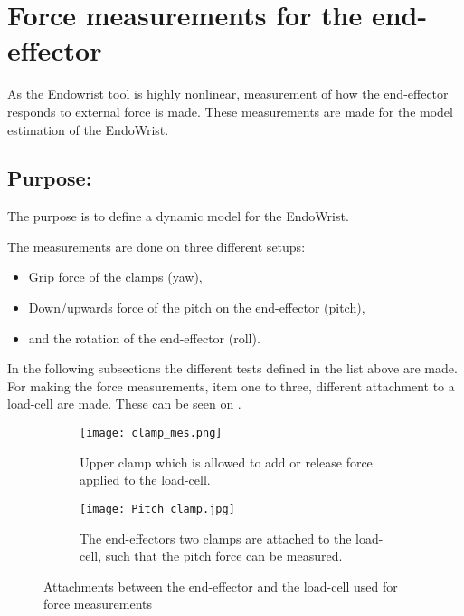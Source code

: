 \section{Force measurements for the end-effector} %

As the Endowrist tool is highly nonlinear, measurement of how the end-effector responds to external force is made. These measurements are made for the model estimation of the EndoWrist.  

\subsection*{Purpose:}
The purpose is to define a dynamic model for the EndoWrist.

The measurements are done on three different setups:
\begin{itemize}
\item Grip force of the clamps (yaw),
\item Down/upwards force of the pitch on the end-effector (pitch),
\item and the rotation of the end-effector (roll).
\end{itemize}

In the following subsections the different tests defined in the list above are made. For making the force measurements, item one to three, different attachment to a load-cell are made. These can be seen on .
\begin{figure}[H]
	\centering
	\begin{subfigure}{.48\textwidth}
		\centering
		\vspace{-12pt}
		\texttt{[image: clamp\_mes.png]}
		\caption{Upper clamp which is allowed to add or release force applied to the load-cell.}
		\label{fig:one_clamp}
	\end{subfigure}
	\begin{subfigure}{.48\textwidth}
		\centering
		\texttt{[image: Pitch\_clamp.jpg]}
		\caption{The end-effectors two clamps are attached to the load-cell, such that the pitch force can be measured.}
		\label{fig:pitch_force}
	\end{subfigure}
\caption{Attachments between the end-effector and the load-cell used for force measurements}
\label{fig:Overview_endowrist_attachment}
\end{figure}

